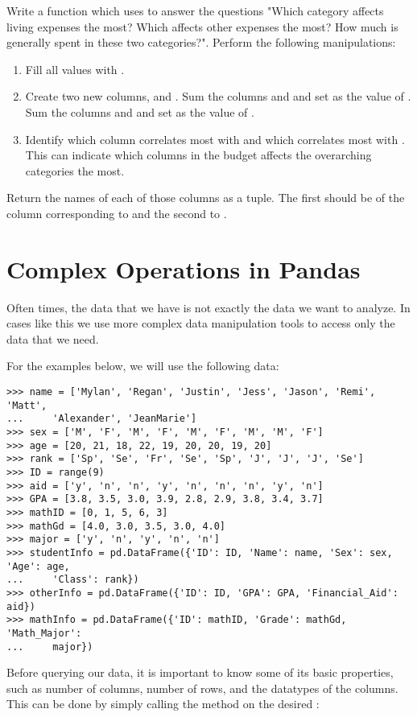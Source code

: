\begin{problem}
Write a function which uses  to answer the questions "Which category affects living expenses the most? Which affects other expenses the most? How much is generally spent in these two categories?".
Perform the following manipulations:
\begin{enumerate}
\item Fill all  values with .
\item Create two new columns,  and .
Sum the columns  and  and set as the value of .
Sum the columns  and  and set as the value of .
\item Identify which column correlates most with  and which correlates most with .
This can indicate which columns in the budget affects the overarching categories the most.
\end{enumerate}
Return the names of each of those columns as a tuple.
The first should be of the column corresponding to  and the second to .
\end{problem}

\section*{Complex Operations in Pandas}
Often times, the data that we have is not exactly the data we want to analyze.
In cases like this we use more complex data manipulation tools to access only the data that we need.

For the examples below, we will use the following data:
\begin{lstlisting}
>>> name = ['Mylan', 'Regan', 'Justin', 'Jess', 'Jason', 'Remi', 'Matt',
...		'Alexander', 'JeanMarie']
>>> sex = ['M', 'F', 'M', 'F', 'M', 'F', 'M', 'M', 'F']
>>> age = [20, 21, 18, 22, 19, 20, 20, 19, 20]
>>> rank = ['Sp', 'Se', 'Fr', 'Se', 'Sp', 'J', 'J', 'J', 'Se']
>>> ID = range(9)
>>> aid = ['y', 'n', 'n', 'y', 'n', 'n', 'n', 'y', 'n']
>>> GPA = [3.8, 3.5, 3.0, 3.9, 2.8, 2.9, 3.8, 3.4, 3.7]
>>> mathID = [0, 1, 5, 6, 3]
>>> mathGd = [4.0, 3.0, 3.5, 3.0, 4.0]
>>> major = ['y', 'n', 'y', 'n', 'n']
>>> studentInfo = pd.DataFrame({'ID': ID, 'Name': name, 'Sex': sex, 'Age': age,
...		'Class': rank})
>>> otherInfo = pd.DataFrame({'ID': ID, 'GPA': GPA, 'Financial_Aid': aid})
>>> mathInfo = pd.DataFrame({'ID': mathID, 'Grade': mathGd, 'Math_Major':
...		major})
\end{lstlisting}
Before querying our data, it is important to know some of its basic properties,
such as number of columns, number of rows, and the datatypes of the columns.
This can be done by simply calling the  method on the desired
:

